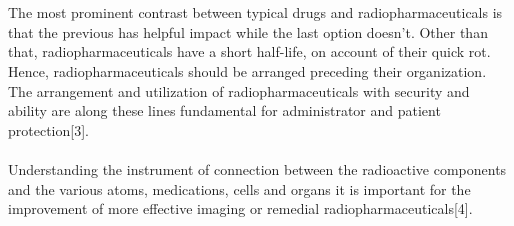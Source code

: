 \documentclass[12pt]{article}
\begin{document}
\\
\\
The most prominent contrast between typical drugs and radiopharmaceuticals is that the previous has helpful impact while the last option doesn't. Other than that, radiopharmaceuticals have a short half-life, on account of their quick rot. Hence, radiopharmaceuticals should be arranged preceding their organization. The arrangement and utilization of radiopharmaceuticals with security and ability are along these lines fundamental for administrator and patient protection[3].
\\
\\
Understanding the instrument of connection between the radioactive components and the various atoms, medications, cells and organs it is important for the improvement of more effective imaging or remedial radiopharmaceuticals[4].
\\
\end{document}
